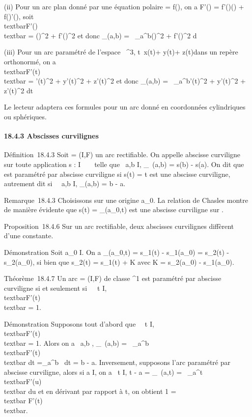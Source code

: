 \documentclass[]{article}
\begin{document}
(ii) Pour un arc plan donné par une équation polaire \rho = f(\theta), on a
F'(\theta) = f'(\theta)\vecu(\theta) +
f(\theta)\vecu'(\theta), soit
\\textbar{}F'(\theta)\\textbar{} =
\sqrtf(\theta)^2  + f'(\theta)^2 et donc
\ell\_\Gamma(a,b) =\int ~
\_a^b\sqrtf(\theta)^2  +
f'(\theta)^2 d\theta

(iii) Pour un arc paramétré de l'espace ~^3,
t\mapsto~x(t)\vec\imath +
y(t) + z(t)\veck dans un
repère orthonormé, on a
\\textbar{}F'(t)\\textbar{} =
\sqrtx'(t)^2  + y'(t)^2  +
z'(t)^2 et donc \ell\_\Gamma(a,b)
=\int ~
\_a^b\sqrtx'(t)^2  +
y'(t)^2  + z'(t)^2 dt

Le lecteur adaptera ces formules pour un arc donné en coordonnées
cylindriques ou sphériques.

\paragraph{18.4.3 Abscisses curvilignes}

Définition~18.4.3 Soit \Gamma = (I,F) un arc rectifiable. On appelle abscisse
curviligne sur \Gamma toute application s : I \rightarrow~ ~ telle que
\forall~a,b \in I, \ell\_\Gamma~(a,b) = s(b) - s(a). On
dit que \Gamma est paramétré par abscisse curviligne si s(t) = t est une
abscisse curviligne, autrement dit si \forall~~a,b \in
I, \ell\_\Gamma(a,b) = b - a.

Remarque~18.4.3 Choisissons sur \Gamma une origine a\_0. La relation
de Chasles montre de manière évidente que s(t) =
\ell\_\Gamma(a\_0,t) est une abscisse curviligne sur \Gamma.

Proposition~18.4.6 Sur un arc rectifiable, deux abscisses curvilignes
diffèrent d'une constante.

Démonstration Soit a\_0 \in I. On a \ell\_\Gamma(a\_0,t) =
s\_1(t) - s\_1(a\_0) = s\_2(t) -
s\_2(a\_0), si bien que s\_2(t) =
s\_1(t) + K avec K = s\_2(a\_0) -
s\_1(a\_0).

Théorème~18.4.7 Un arc \Gamma = (I,F) de classe ^1 est paramétré
par abscisse curviligne si et seulement si~\forall~~t
\in I, \\textbar{}F'(t)\\textbar{} = 1.

Démonstration Supposons tout d'abord que \forall~~t \in
I, \\textbar{}F'(t)\\textbar{} = 1. Alors
on a \forall~a,b \in \Gamma, \ell\_\Gamma~(a,b)
=\int ~
\_a^b\\textbar{}F'(t)\\textbar{}
dt =\int  \_a^b~ dt = b - a.
Inversement, supposons l'arc paramétré par abscisse curviligne, alors si
a \in I, on a \forall~t \in I, t - a = \ell\_\Gamma~(a,t)
=\int ~
\_a^t\\textbar{}F'(u)\\textbar{}
du et en dérivant par rapport à t, on obtient 1
=\\textbar{} F'(t)\\textbar{}.
\end{document}
